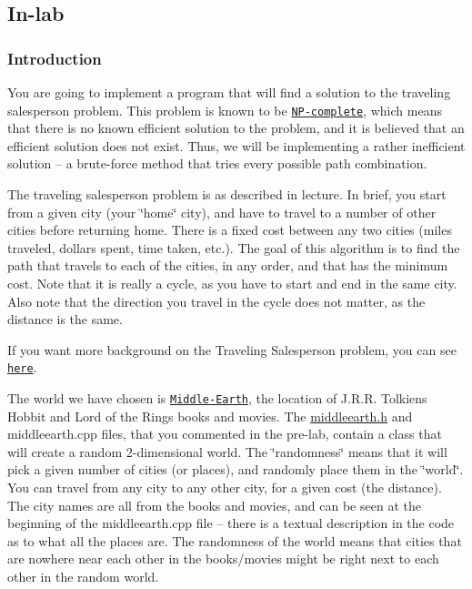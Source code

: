 \subsection*{In-\/lab }

\subsubsection*{Introduction}

You are going to implement a program that will find a solution to the traveling salesperson problem. This problem is known to be \href{http://en.wikipedia.org/wiki/Np-complete}{\tt N\+P-\/complete}, which means that there is no known efficient solution to the problem, and it is believed that an efficient solution does not exist. Thus, we will be implementing a rather inefficient solution -- a brute-\/force method that tries every possible path combination.

The traveling salesperson problem is as described in lecture. In brief, you start from a given city (your \char`\"{}home\char`\"{} city), and have to travel to a number of other cities before returning home. There is a fixed cost between any two cities (miles traveled, dollars spent, time taken, etc.). The goal of this algorithm is to find the path that travels to each of the cities, in any order, and that has the minimum cost. Note that it is really a cycle, as you have to start and end in the same city. Also note that the direction you travel in the cycle does not matter, as the distance is the same.

If you want more background on the Traveling Salesperson problem, you can see \href{http://www-e.uni-magdeburg.de/mertens/TSP/TSP.html}{\tt here}.

The world we have chosen is \href{http://en.wikipedia.org/wiki/Middle-earth}{\tt Middle-\/\+Earth}, the location of J.\+R.\+R. Tolkien\textquotesingle{}s Hobbit and Lord of the Rings books and movies. The \hyperlink{middleearth_8h_source}{middleearth.\+h} and middleearth.\+cpp files, that you commented in the pre-\/lab, contain a class that will create a random 2-\/dimensional world. The \char`\"{}randomness\char`\"{} means that it will pick a given number of cities (or places), and randomly place them in the \char`\"{}world\char`\"{}. You can travel from any city to any other city, for a given cost (the distance). The city names are all from the books and movies, and can be seen at the beginning of the middleearth.\+cpp file -- there is a textual description in the code as to what all the places are. The randomness of the world means that cities that are nowhere near each other in the books/movies might be right next to each other in the random world.

